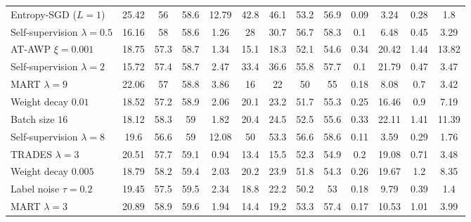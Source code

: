 \begin{table}[t]
{\begin{tabularx}{\textwidth}{|X|c|c|c||c|c|c||c|c||c|c|c|c|}
		\rowcolor{colorbrewer5!15}\hspace*{2px} Entropy-SGD ($L{=}1$) & 25.42 & 56 & 58.6 & 12.79 & 42.8 & 46.1 & 53.2 & 56.9 & 0.09 & 3.24 & 0.28 & 1.8\\
		\rowcolor{colorbrewer5!15}\hspace*{2px} Self-supervision $\lambda{=}0.5$ & 16.16 & 58 & 58.6 & 1.26 & 28 & 30.7 & 56.7 & 58.3 & 0.1 & 6.48 & 0.45 & 3.29\\
		\rowcolor{colorbrewer5!15}\hspace*{2px} AT-AWP $\xi{=}0.001$ & 18.75 & 57.3 & 58.7 & 1.34 & 15.1 & 18.3 & 52.1 & 54.6 & 0.34 & 20.42 & 1.44 & 13.82\\
		\rowcolor{colorbrewer5!15}\hspace*{2px} Self-supervision $\lambda{=}2$ & 15.72 & 57.4 & 58.7 & 2.47 & 33.4 & 36.6 & 55.8 & 57.7 & 0.1 & 21.79 & 0.47 & 3.47\\
		\rowcolor{colorbrewer5!15}\hspace*{2px} MART $\lambda{=}9$ & 22.06 & 57 & 58.8 & 3.86 & 16 & 22 & 50 & 55 & 0.18 & 8.08 & 0.7 & 3.42\\
		\rowcolor{colorbrewer5!15}\hspace*{2px} Weight decay $0.01$ & 18.52 & 57.2 & 58.9 & 2.06 & 20.1 & 23.2 & 51.7 & 55.3 & 0.25 & 16.46 & 0.9 & 7.19\\
		\rowcolor{colorbrewer5!15}\hspace*{2px} Batch size $16$ & 18.12 & 58.3 & 59 & 1.82 & 20.4 & 24.5 & 52.5 & 55.6 & 0.33 & 22.11 & 1.41 & 11.39\\
		\rowcolor{colorbrewer5!15}\hspace*{2px} Self-supervision $\lambda{=}8$ & 19.6 & 56.6 & 59 & 12.08 & 50 & 53.3 & 56.6 & 58.6 & 0.11 & 3.59 & 0.29 & 1.76\\
		\rowcolor{colorbrewer5!15}\hspace*{2px} TRADES $\lambda{=}3$ & 20.51 & 57.7 & 59.1 & 0.94 & 13.4 & 15.5 & 52.3 & 54.9 & 0.2 & 19.08 & 0.71 & 3.48\\
		\rowcolor{colorbrewer5!15}\hspace*{2px} Weight decay $0.005$ & 18.79 & 58.2 & 59.4 & 2.03 & 20.2 & 23.9 & 51.8 & 54.3 & 0.26 & 19.67 & 1.2 & 8.35\\
		\rowcolor{colorbrewer5!15}\hspace*{2px} Label noise $\tau{=}0.2$ & 19.45 & 57.5 & 59.5 & 2.34 & 18.8 & 22.2 & 50.2 & 53 & 0.18 & 9.79 & 0.39 & 1.4\\
		\rowcolor{colorbrewer5!15}\hspace*{2px} MART $\lambda{=}3$ & 20.89 & 58.9 & 59.6 & 1.94 & 14.4 & 19.2 & 53.3 & 57.4 & 0.17 & 10.53 & 1.01 & 3.99\\

\end{tabularx}}
\end{table}
